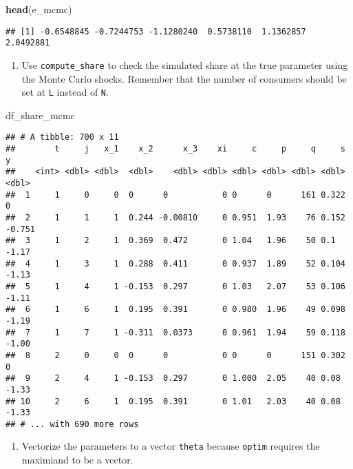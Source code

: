 \documentclass[
]{book}
\newenvironment{Shaded}{\begin{snugshade}}{\end{snugshade}}
\newcommand{\KeywordTok}[1]{\textcolor[rgb]{0.13,0.29,0.53}{\textbf{#1}}}
\newcommand{\NormalTok}[1]{#1}
\providecommand{\tightlist}{%
  \setlength{\itemsep}{0pt}\setlength{\parskip}{0pt}}
\begin{document}
\begin{Shaded}
\begin{Highlighting}[]
\KeywordTok{head}\NormalTok{(e_mcmc)}
\end{Highlighting}
\end{Shaded}

\begin{verbatim}
## [1] -0.6548845 -0.7244753 -1.1280240  0.5738110  1.1362857  2.0492881
\end{verbatim}

\begin{enumerate}
\def\labelenumi{\arabic{enumi}.}
\setcounter{enumi}{2}
\tightlist
\item
  Use \texttt{compute\_share} to check the simulated share at the true parameter using the Monte Carlo shocks. Remember that the number of consumers should be set at \texttt{L} instead of \texttt{N}.
\end{enumerate}

\begin{Shaded}
\begin{Highlighting}[]
\NormalTok{df_share_mcmc}
\end{Highlighting}
\end{Shaded}

\begin{verbatim}
## # A tibble: 700 x 11
##        t     j   x_1    x_2      x_3    xi     c     p     q     s      y
##    <int> <dbl> <dbl>  <dbl>    <dbl> <dbl> <dbl> <dbl> <dbl> <dbl>  <dbl>
##  1     1     0     0  0      0           0 0      0      161 0.322  0    
##  2     1     1     1  0.244 -0.00810     0 0.951  1.93    76 0.152 -0.751
##  3     1     2     1  0.369  0.472       0 1.04   1.96    50 0.1   -1.17 
##  4     1     3     1  0.288  0.411       0 0.937  1.89    52 0.104 -1.13 
##  5     1     4     1 -0.153  0.297       0 1.03   2.07    53 0.106 -1.11 
##  6     1     6     1  0.195  0.391       0 0.980  1.96    49 0.098 -1.19 
##  7     1     7     1 -0.311  0.0373      0 0.961  1.94    59 0.118 -1.00 
##  8     2     0     0  0      0           0 0      0      151 0.302  0    
##  9     2     4     1 -0.153  0.297       0 1.000  2.05    40 0.08  -1.33 
## 10     2     6     1  0.195  0.391       0 1.01   2.03    40 0.08  -1.33 
## # ... with 690 more rows
\end{verbatim}

\begin{enumerate}
\def\labelenumi{\arabic{enumi}.}
\setcounter{enumi}{4}
\tightlist
\item
  Vectorize the parameters to a vector \texttt{theta} because \texttt{optim} requires the maximiand to be a vector.
\end{enumerate}
\end{document}
